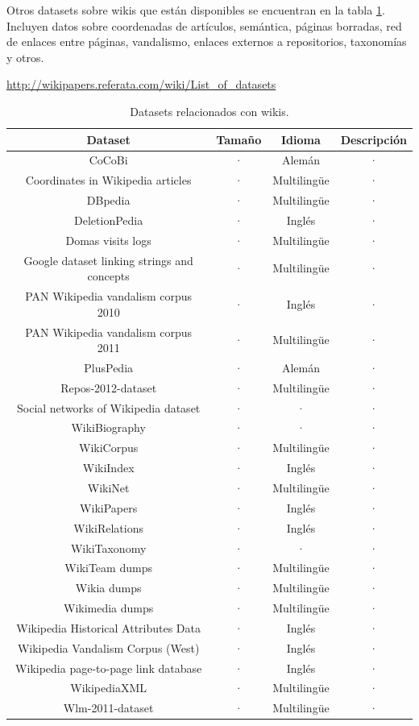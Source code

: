 \documentclass[11pt,onecolumn]{article}
\begin{document}
Otros datasets sobre wikis que están disponibles se encuentran en la tabla \ref{tab:datasetstable}. Incluyen datos sobre coordenadas de artículos, semántica, páginas borradas, red de enlaces entre páginas, vandalismo, enlaces externos a repositorios, taxonomías y otros.

\href{http://wikipapers.referata.com/wiki/List_of_datasets}{http://wikipapers.referata.com/wiki/List\_of\_datasets}

\begin{table}
\centering
\begin{tabular}{| c | c | c | c |}
\hline
\textbf{Dataset} & \textbf{Tamaño} & \textbf{Idioma} & \textbf{Descripción} \\
\hline
CoCoBi & · & Alemán & · \\ \hline 
Coordinates in Wikipedia articles & · & Multilingüe & · \\ \hline 
DBpedia & · & Multilingüe & · \\ \hline 
DeletionPedia & · & Inglés & · \\ \hline 
Domas visits logs & · & Multilingüe & · \\ \hline 
Google dataset linking strings and concepts & · & Multilingüe & · \\ \hline 
PAN Wikipedia vandalism corpus 2010 & · & Inglés & · \\ \hline 
PAN Wikipedia vandalism corpus 2011 & · & Multilingüe & · \\ \hline 
PlusPedia & · & Alemán & · \\ \hline 
Repos-2012-dataset & · & Multilingüe & · \\ \hline 
Social networks of Wikipedia dataset & · & · & · \\ \hline 
WikiBiography & · & · & · \\ \hline 
WikiCorpus & · & Multilingüe & · \\ \hline 
WikiIndex & · & Inglés & · \\ \hline 
WikiNet & · & Multilingüe & · \\ \hline 
WikiPapers & · & Inglés & · \\ \hline 
WikiRelations & · & Inglés & · \\ \hline 
WikiTaxonomy & · & · & · \\ \hline 
WikiTeam dumps & · & Multilingüe & · \\ \hline 
Wikia dumps & · & Multilingüe & · \\ \hline 
Wikimedia dumps & · & Multilingüe & · \\ \hline 
Wikipedia Historical Attributes Data & · & Inglés & · \\ \hline 
Wikipedia Vandalism Corpus (West) & · & Inglés & · \\ \hline 
Wikipedia page-to-page link database & · & Inglés & · \\ \hline 
WikipediaXML & · & Multilingüe & · \\ \hline 
Wlm-2011-dataset & · & Multilingüe & · \\ \hline
\end{tabular}
\caption{Datasets relacionados con wikis.}
\label{tab:datasetstable}
\end{table}
\end{document}
